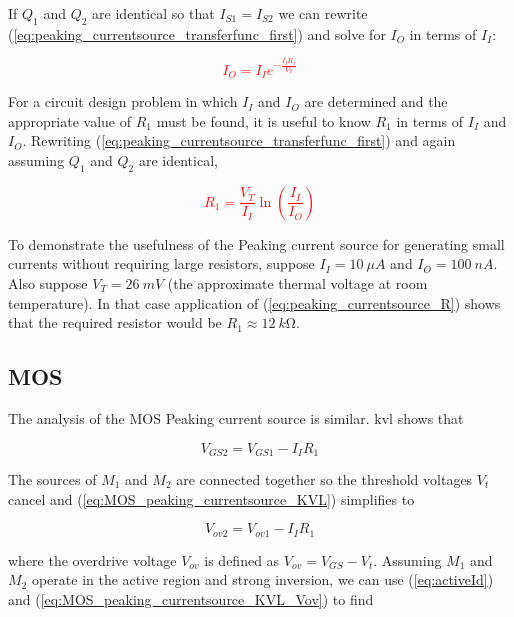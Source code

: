 If $Q_1$ and $Q_2$ are identical so that $I_{S1} = I_{S2}$ we can rewrite (\ref{eq:peaking_currentsource_transferfunc_first}) and solve for $I_{O}$ in terms of $I_{I}$:

\textcolor{red}{
\begin{equation}
I_{O} = I_{I}e^{-\frac{I_{I}R_{1}}{V_{T}}}
\end{equation}
}

For a circuit design problem in which $I_{I}$ and $I_{O}$ are determined and the appropriate value of $R_{1}$ must be found, it is useful to know $R_{1}$ in terms of $I_{I}$ and $I_{O}$.
Rewriting (\ref{eq:peaking_currentsource_transferfunc_first}) and again assuming $Q_1$ and $Q_2$ are identical,

\textcolor{red}{
\begin{equation}
R_1 = \frac{V_{T}}{I_{I}}\ln\left(\frac{I_{I}}{I_{O}}\right)
\label{eq:peaking_currentsource_R}
\end{equation}
}

To demonstrate the usefulness of the Peaking current source for generating small currents without requiring large resistors, suppose $I_{I} = \SI{10}{\mu A}$ and $I_{O} = \SI{100}{nA}$.
Also suppose $V_{T} = \SI{26}{mV}$ (the approximate thermal voltage at room temperature).
In that case application of (\ref{eq:peaking_currentsource_R}) shows that the required resistor would be $R_1 \approx \SI{12}{k\ohm}$. \autocite[303-304]{analysis-design-analog-ics}

\subsection{MOS}
The analysis of the MOS Peaking current source is similar. \ac{kvl} shows that

\begin{equation}
V_{GS2} = V_{GS1} - I_{I}R_{1}
\label{eq:MOS_peaking_currentsource_KVL}
\end{equation}

The sources of $M_1$ and $M_2$ are connected together so the threshold voltages $V_{t}$ cancel and (\ref{eq:MOS_peaking_currentsource_KVL}) simplifies to

\begin{equation}
V_{ov2} = V_{ov1} - I_{I}R_{1}
\label{eq:MOS_peaking_currentsource_KVL_Vov}
\end{equation}

where the overdrive voltage $V_{ov}$ is defined as $V_{ov} = V_{GS} - V_{t}$.
Assuming $M_1$ and $M_2$ operate in the active region and strong inversion, we can use (\ref{eq:activeId}) and (\ref{eq:MOS_peaking_currentsource_KVL_Vov}) to find

